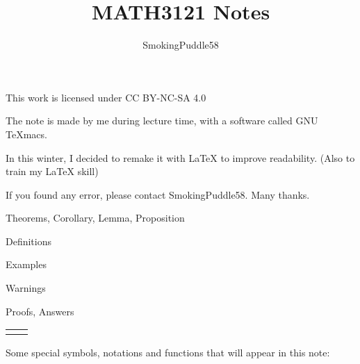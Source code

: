 \documentclass{article}
\title{MATH3121 Notes}
\author{SmokingPuddle58}
\theoremstyle{MyNonumberplain}
\theoremstyle{break}
\theoremstyle{break}
\theoremstyle{break}
\theoremstyle{definition}
\theoremstyle{break}
\begin{document}
\maketitle

\begin{center}
    This work is licensed under CC BY-NC-SA 4.0
\end{center}


\newpage


    The note is made by me during lecture time, with a software called GNU TeXmacs.

    In this winter, I decided to remake it with LaTeX to improve readability. (Also to train my LaTeX skill)

    If you found any error, please contact SmokingPuddle58. Many thanks.

    \bigskip


\begin{thmbox}
    Theorems, Corollary, Lemma, Proposition
\end{thmbox}

\begin{defbox}
    Definitions
\end{defbox}

\begin{expbox}
    Examples
\end{expbox}

\begin{warnbox}
    Warnings
\end{warnbox}

\begin{prfbox}
    Proofs, Answers
\end{prfbox}

\begin{tabular}{ll}
    &\\
\end{tabular}

Some special symbols, notations and functions that will appear in this note:\bigskip
\end{document}
